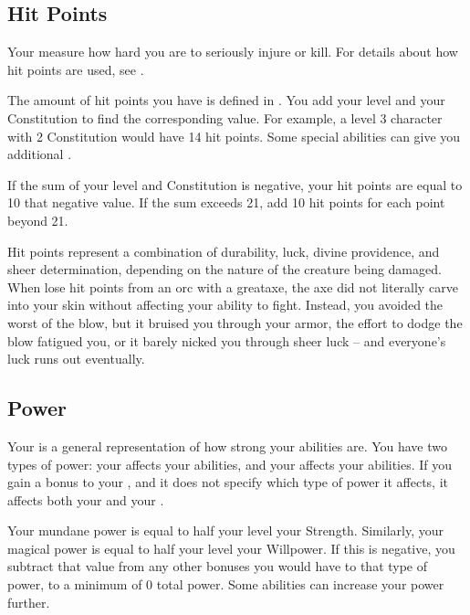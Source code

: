     \subsection{Hit Points}\label{Hit Points}
        Your  measure how hard you are to seriously injure or kill.
        For details about how hit points are used, see .

        The amount of hit points you have is defined in .
        You add your level and your Constitution to find the corresponding value.
        For example, a level 3 character with 2 Constitution would have 14 hit points.
        Some special abilities can give you additional .

        If the sum of your level and Constitution is negative, your hit points are equal to 10 \add that negative value.
        If the sum exceeds 21, add 10 hit points for each point beyond 21.

         Hit points represent a combination of durability, luck, divine providence, and sheer determination, depending on the nature of the creature being damaged.
        When lose hit points from an orc with a greataxe, the axe did not literally carve into your skin without affecting your ability to fight.
        Instead, you avoided the worst of the blow, but it bruised you through your armor, the effort to dodge the blow fatigued you, or it barely nicked you through sheer luck -- and everyone's luck runs out eventually.

    \subsection{Power}\label{Power}
        Your  is a general representation of how strong your abilities are.
        You have two types of power: your  affects your  abilities, and your  affects your  abilities.
        If you gain a bonus to your , and it does not specify which type of power it affects, it affects both your  and your .

        Your mundane power is equal to half your level \add your Strength.
        Similarly, your magical power is equal to half your level \add your Willpower.
        If this is negative, you subtract that value from any other bonuses you would have to that type of power, to a minimum of 0 total power.
        Some abilities can increase your power further.

